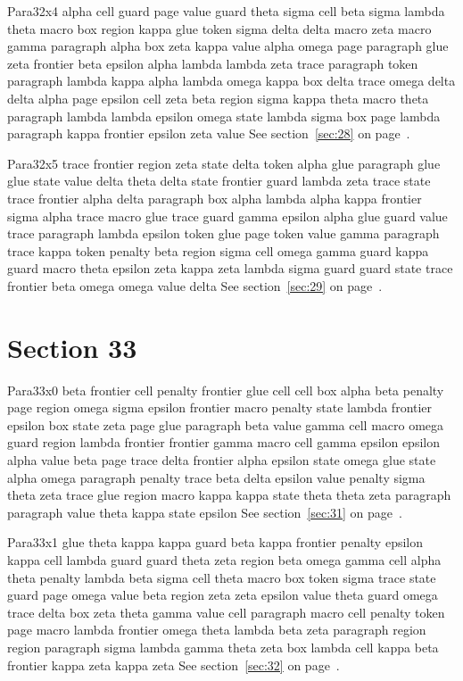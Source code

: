 \documentclass{article}
\begin{document}
Para32x4 alpha cell guard page value guard theta sigma cell beta sigma lambda theta macro box region kappa glue token sigma delta delta macro zeta macro gamma paragraph alpha box zeta kappa value alpha omega page paragraph glue zeta frontier beta epsilon alpha lambda lambda zeta trace paragraph token paragraph lambda kappa alpha lambda omega kappa box delta trace omega delta delta alpha page epsilon cell zeta beta region sigma kappa theta macro theta paragraph lambda lambda epsilon omega state lambda sigma box page lambda paragraph kappa frontier epsilon zeta value See section~\ref{sec:28} on page~\pageref{sec:20}.

Para32x5 trace frontier region zeta state delta token alpha glue paragraph glue glue state value delta theta delta state frontier guard lambda zeta trace state trace frontier alpha delta paragraph box alpha lambda alpha kappa frontier sigma alpha trace macro glue trace guard gamma epsilon alpha glue guard value trace paragraph lambda epsilon token glue page token value gamma paragraph trace kappa token penalty beta region sigma cell omega gamma guard kappa guard macro theta epsilon zeta kappa zeta lambda sigma guard guard state trace frontier beta omega omega value delta See section~\ref{sec:29} on page~\pageref{sec:21}.

\section{Section 33}\label{sec:33}
Para33x0 beta frontier cell penalty frontier glue cell cell box alpha beta penalty page region omega sigma epsilon frontier macro penalty state lambda frontier epsilon box state zeta page glue paragraph beta value gamma cell macro omega guard region lambda frontier frontier gamma macro cell gamma epsilon epsilon alpha value beta page trace delta frontier alpha epsilon state omega glue state alpha omega paragraph penalty trace beta delta epsilon value penalty sigma theta zeta trace glue region macro kappa kappa state theta theta zeta paragraph paragraph value theta kappa state epsilon See section~\ref{sec:31} on page~\pageref{sec:19}.

Para33x1 glue theta kappa kappa guard beta kappa frontier penalty epsilon kappa cell lambda guard guard theta zeta region beta omega gamma cell alpha theta penalty lambda beta sigma cell theta macro box token sigma trace state guard page omega value beta region zeta zeta epsilon value theta guard omega trace delta box zeta theta gamma value cell paragraph macro cell penalty token page macro lambda frontier omega theta lambda beta zeta paragraph region region paragraph sigma lambda gamma theta zeta box lambda cell kappa beta frontier kappa zeta kappa zeta See section~\ref{sec:32} on page~\pageref{sec:20}.
\end{document}

